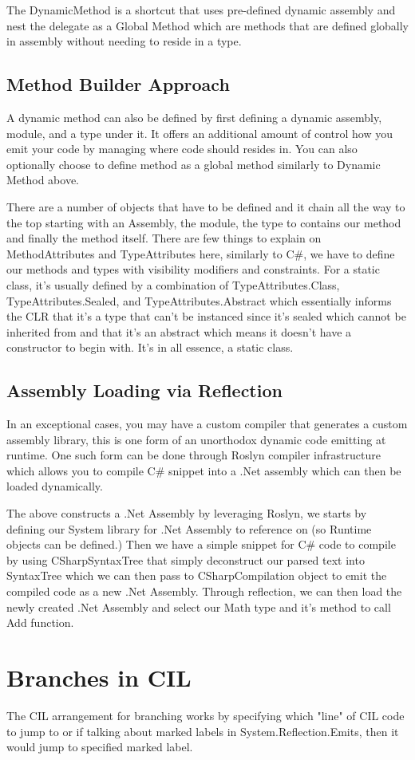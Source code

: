 

The DynamicMethod is a shortcut that uses pre-defined dynamic assembly and nest the delegate as a Global Method which are methods that are defined globally in assembly without needing to reside in a type.

\newpage

\subsection{Method Builder Approach}
A dynamic method can also be defined by first defining a dynamic assembly, module, and a type under it. It offers an additional amount of control how you emit your code by managing where code should resides in. You can also optionally choose to define method as a global method similarly to Dynamic Method above.



There are a number of objects that have to be defined and it chain all the way to the top starting with an Assembly, the module, the type to contains our method and finally the method itself. There are few things to explain on MethodAttributes and TypeAttributes here, similarly to C\#, we have to define our methods and types with visibility modifiers and constraints. For a static class, it's usually defined by a combination of TypeAttributes.Class, TypeAttributes.Sealed, and TypeAttributes.Abstract which essentially informs the CLR that it's a type that can't be instanced since it's sealed which cannot be inherited from and that it's an abstract which means it doesn't have a constructor to begin with. It's in all essence, a static class.

\newpage

\subsection{Assembly Loading via Reflection}
In an exceptional cases, you may have a custom compiler that generates a custom assembly library, this is one form of an unorthodox dynamic code emitting at runtime. One such form can be done through Roslyn compiler infrastructure which allows you to compile C\# snippet into a .Net assembly which can then be loaded dynamically.



The above constructs a .Net Assembly by leveraging Roslyn, we starts by defining our System library for .Net Assembly to reference on (so Runtime objects can be defined.) Then we have a simple snippet for C\# code to compile by using CSharpSyntaxTree that simply deconstruct our parsed text into SyntaxTree which we can then pass to CSharpCompilation object to emit the compiled code as a new .Net Assembly. Through reflection, we can then load the newly created .Net Assembly and select our Math type and it's method to call Add function.

\section{Branches in CIL}

The CIL arrangement for branching works by specifying which "line" of CIL code to jump to or if talking about marked labels in System.Reflection.Emits, then it would jump to specified marked label.
